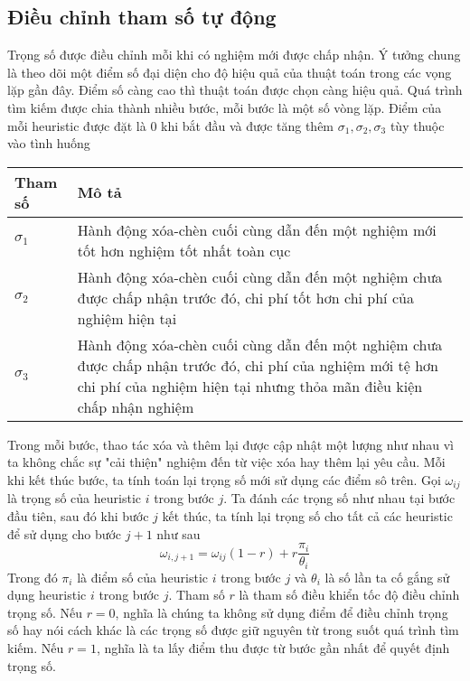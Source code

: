 \subsection{Điều chỉnh tham số tự động}
Trọng số được điều chỉnh mỗi khi có nghiệm mới được chấp nhận. Ý tưởng chung là theo dõi một điểm số đại diện cho độ hiệu quả của thuật toán trong các vọng lặp gần đây. Điểm số càng cao thì thuật toán được chọn càng hiệu quả. Quá trình tìm kiếm được chia thành nhiều bước, mỗi bước là một số vòng lặp. Điểm của mỗi heuristic được đặt là $0$ khi bắt đầu và được tăng thêm $\sigma_1, \sigma_2, \sigma_3$ tùy thuộc vào tình huống
\begin{table}[caption={Tham số cập nhật trọng số}, label=tab:weight]
	\begin{tabularx}{\textwidth}{|l|X|}
		\hline
		Tham số    & Mô tả  \\ \hline
		$\sigma_1$ & Hành động xóa-chèn cuối cùng dẫn đến một nghiệm mới tốt hơn nghiệm tốt nhất toàn cục \\ \hline
		$\sigma_2$ & Hành động xóa-chèn cuối cùng dẫn đến một nghiệm chưa được chấp nhận trước đó, chi phí tốt hơn chi phí của nghiệm hiện tại \\ \hline
		$\sigma_3$ & Hành động xóa-chèn cuối cùng dẫn đến một nghiệm chưa được chấp nhận trước đó, chi phí của nghiệm mới tệ hơn chi phí của nghiệm hiện tại nhưng thỏa mãn điều kiện chấp nhận nghiệm \\ \hline
	\end{tabularx}
\end{table}
Trong mỗi bước, thao tác xóa và thêm lại được cập nhật một lượng như nhau vì ta không chắc sự "cải thiện" nghiệm đến từ việc xóa hay thêm lại yêu cầu. Mỗi khi kết thúc bước, ta tính toán lại trọng số mới sử dụng các điểm sô trên. Gọi $\omega_{ij}$ là trọng số của heuristic $i$ trong bước $j$. Ta đánh các trọng số như nhau tại bước đầu tiên, sau đó khi bước $j$ kết thúc, ta tính lại trọng số cho tất cả các heuristic để sử dụng cho bước $j+1$ như sau
\begin{equation}
	\label{eq:adaptive_weight}
	\omega_{i, j+1} = \omega_{ij}(1-r)+r\frac{\pi_i}{\theta_i}
\end{equation}
Trong đó $\pi_i$ là điểm số của heuristic $i$ trong bước $j$ và $\theta_i$ là số lần ta cố gắng sử dụng heuristic $i$ trong bước $j$. Tham số $r$ là tham số điều khiển tốc độ điều chỉnh trọng số. Nếu $r=0$, nghĩa là chúng ta không sử dụng điểm để điều chỉnh trọng số hay nói cách khác là các trọng số được giữ nguyên từ trong suốt quá trình tìm kiếm. Nếu $r=1$, nghĩa là ta lấy điểm thu được từ bước gần nhất để quyết định trọng số.

